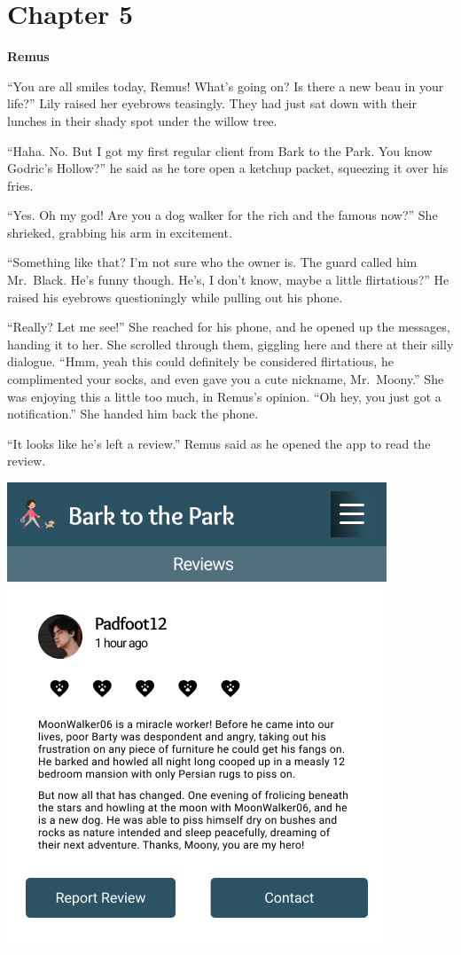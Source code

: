 \documentclass[12pt,twoside,openright]{memoir}
\begin{document}
\chapter*{Chapter 5}

\textbf{Remus}


``You are all smiles today, Remus! What's going on? Is there a new beau in your life?'' Lily raised her eyebrows teasingly. They had just sat down with their lunches in their shady spot under the willow tree.

``Haha. No. But I got my first regular client from Bark to the Park. You know Godric's Hollow?'' he said as he tore open a ketchup packet, squeezing it over his fries.

``Yes. Oh my god! Are you a dog walker for the rich and the famous now?'' She shrieked, grabbing his arm in excitement.

``Something like that? I'm not sure who the owner is. The guard called him Mr.\ Black. He's funny though. He's, I don't know, maybe a little flirtatious?'' He raised his eyebrows questioningly while pulling out his phone.

``Really? Let me see!'' She reached for his phone, and he opened up the messages, handing it to her. She scrolled through them, giggling here and there at their silly dialogue. ``Hmm, yeah this could definitely be considered flirtatious, he complimented your socks, and even gave you a cute nickname, Mr.\ Moony.'' She was enjoying this a little too much, in Remus's opinion. ``Oh hey, you just got a notification.'' She handed him back the phone.

``It looks like he's left a review.'' Remus said as he opened the app to read the review.

\bigskip

{\hfill\includegraphics[height=\textheight]{Review RegularFont}\hfill}
 
\end{document}
